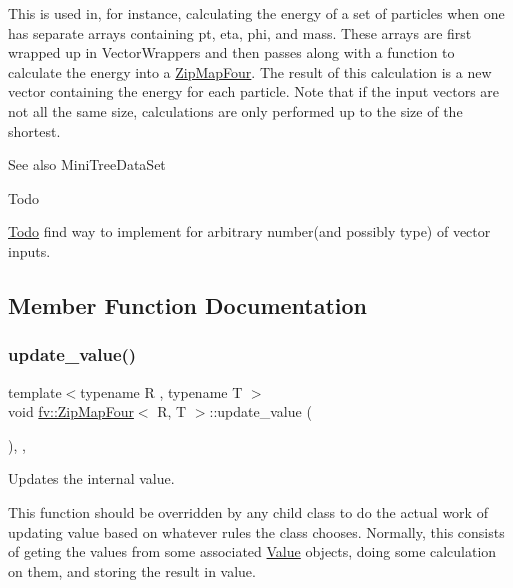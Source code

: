 This is used in, for instance, calculating the energy of a set of particles when one has separate arrays containing pt, eta, phi, and mass. These arrays are first wrapped up in Vector\+Wrappers and then passes along with a function to calculate the energy into a \hyperlink{classfv_1_1ZipMapFour}{Zip\+Map\+Four}. The result of this calculation is a new vector containing the energy for each particle. Note that if the input vectors are not all the same size, calculations are only performed up to the size of the shortest. \begin{DoxySeeAlso}{See also}
Mini\+Tree\+Data\+Set 
\end{DoxySeeAlso}
\begin{DoxyRefDesc}{Todo}
\item[\hyperlink{todo__todo000001}{Todo}]find way to implement for arbitrary number(and possibly type) of vector inputs. \end{DoxyRefDesc}


\subsection{Member Function Documentation}
\hypertarget{classfv_1_1ZipMapFour_a812747fdc043c776951ceb93a1085915}{}\label{classfv_1_1ZipMapFour_a812747fdc043c776951ceb93a1085915} 
\subsubsection{\texorpdfstring{update\+\_\+value()}{update\_value()}}
{\footnotesize\ttfamily template$<$typename R , typename T $>$ \\
void \hyperlink{classfv_1_1ZipMapFour}{fv\+::\+Zip\+Map\+Four}$<$ R, T $>$\+::update\+\_\+value (\begin{DoxyParamCaption}{ }\end{DoxyParamCaption})\hspace{0.3cm}{\ttfamily [inline]}, {\ttfamily [private]}, {\ttfamily [virtual]}}



Updates the internal value. 

This function should be overridden by any child class to do the actual work of updating value based on whatever rules the class chooses. Normally, this consists of geting the values from some associated \hyperlink{classfv_1_1Value}{Value} objects, doing some calculation on them, and storing the result in value. 

